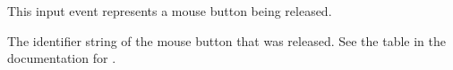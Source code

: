 \documentclass[letterpaper,10pt,english]{sphinxmanual}
\begin{document}

\begin{fulllineitems}
\label{input:sge.input.MouseButtonRelease}
This input event represents a mouse button being released.

\begin{fulllineitems}
\label{input:sge.input.MouseButtonRelease.button}
The identifier string of the mouse button that was released.  See
the table in the documentation for
{\hyperref[input:sge.input.MouseButtonPress]{\emph{}}}.

\end{fulllineitems}


\end{fulllineitems}

\end{document}
